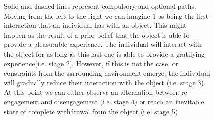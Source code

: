 \begin{figure}[h]
\begin{center}
\begin{adjustbox}{width=\textwidth}


\end{adjustbox}
\end{center}

\caption[\textbf{Stages of the engagement process mode}]{Solid and dashed lines represent compulsory and  optional paths. Moving from the left to the right we can imagine 1 as being the first interaction that an individual has with an object. This might happen as the result of a prior belief that the object is able to provide a pleasurable experience. The individual will interact with the object for as long as this last one is able to provide a gratifying experience(i.e. stage 2). However, if this is not the case, or constraints from the surrounding environment emerge, the individual will gradually reduce their interaction with the object (i.e. stage 3). At this point we can either observe an alternation between re-engagement and disengagement (i.e. stage 4) or reach an inevitable state of complete withdrawal from the object (i.e. stage 5)}
\label{fig: eng_proc_model_1}
\end{figure}